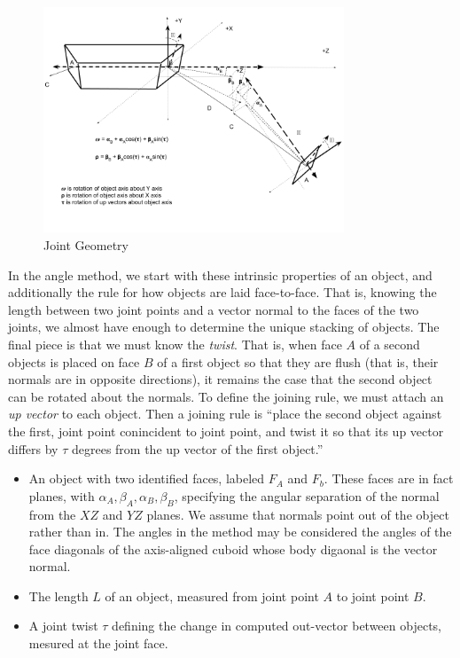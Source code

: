 \documentclass[11pt]{article}
\begin{document}
{\begin{figure}
     \centering
     \includegraphics[width=0.80\textwidth]{figures/JointGeometry.png}
     \caption{Joint Geometry}
  \label{fig:jointdiagram}
\end{figure}


In the angle method, we start with these intrinsic properties of an object, and additionally the
rule for how objects are laid face-to-face. That is, knowing the length between two
joint points and a vector normal to the faces of the two joints, we almost have
enough to determine the unique stacking of objects. The final piece is that we must
know the {\em twist}. That is, when face $A$ of a second objects is placed on face $B$
of a first object so that they are flush (that is, their normals are in opposite directions),
it remains the case that the second object can be rotated about the normals. To
define the joining rule, we must attach an {\em up vector} to each object. Then a joining
rule is ``place the second object against the first, joint point conincident to joint point,
and twist it so that its up vector differs by $\tau$ degrees from the up vector of the first
object.''

\begin{itemize}
\item An object with two identified faces, labeled $F_A$ and $F_b$. These faces are in
  fact planes, with $\alpha_A, \beta_A, \alpha_B, \beta_B$, specifying the
  angular separation of the normal from the $XZ$ and $YZ$ planes. We assume that normals point out
  of the object rather than in. The angles in the method may be considered the angles of the face diagonals of the axis-aligned cuboid whose body digaonal is the vector normal.
\item The length $L$ of an object, measured from joint point $A$ to joint point $B$.
\item A joint twist $\tau$ defining the change in computed out-vector between objects,
  mesured at the joint face.
\end{itemize}

}
\end{document}
